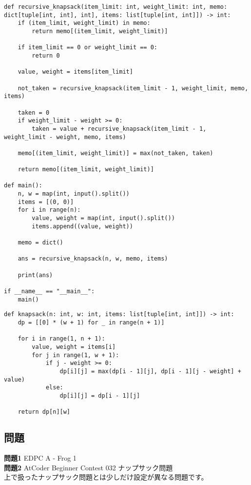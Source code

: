 \documentclass{jlreq}
\begin{document}
\begin{lstlisting}[caption=メモ化再帰を用いたナップサック問題の実装, frame=TRBL, label={memo_knapsack}]
def recursive_knapsack(item_limit: int, weight_limit: int, memo: dict[tuple[int, int], int], items: list[tuple[int, int]]) -> int:
    if (item_limit, weight_limit) in memo:
        return memo[(item_limit, weight_limit)]
    
    if item_limit == 0 or weight_limit == 0:
        return 0
    
    value, weight = items[item_limit]
    
    not_taken = recursive_knapsack(item_limit - 1, weight_limit, memo, items)
    
    taken = 0
    if weight_limit - weight >= 0:
        taken = value + recursive_knapsack(item_limit - 1, weight_limit - weight, memo, items)
    
    memo[(item_limit, weight_limit)] = max(not_taken, taken)
    
    return memo[(item_limit, weight_limit)]

def main():
    n, w = map(int, input().split())
    items = [(0, 0)]  
    for i in range(n):
        value, weight = map(int, input().split())
        items.append((value, weight))
    
    memo = dict()
    
    ans = recursive_knapsack(n, w, memo, items)
    
    print(ans)

if __name__ == "__main__":
    main()
\end{lstlisting}

\begin{lstlisting}[caption=漸化式を用いたナップサック問題の実装, frame=TRBL, label={dp_knapsack}]
def knapsack(n: int, w: int, items: list[tuple[int, int]]) -> int:
    dp = [[0] * (w + 1) for _ in range(n + 1)]
    
    for i in range(1, n + 1):
        value, weight = items[i]
        for j in range(1, w + 1):
            if j - weight >= 0:
                dp[i][j] = max(dp[i - 1][j], dp[i - 1][j - weight] + value)
            else:
                dp[i][j] = dp[i - 1][j]
    
    return dp[n][w]
\end{lstlisting}

\subsection{問題}
\textbf{問題1} EDPC A - Frog 1\\
\textbf{問題2} AtCoder Beginner Contest 032 ナップサック問題\\  
上で扱ったナップサック問題とは少しだけ設定が異なる問題です。\\
\end{document}
